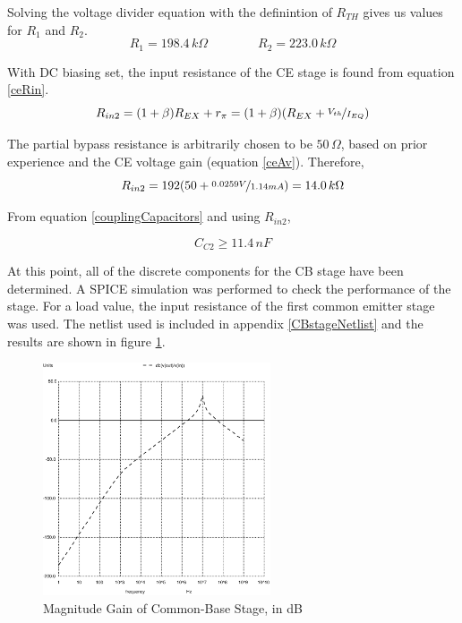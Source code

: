 \documentclass[titlepage, letterpaper, 11pt]{article}
\begin{document}
Solving the voltage divider equation with the definintion of $R_{TH}$
gives us values for $R_{1}$ and $R_{2}$.
\begin{equation*}
R_{1}=198.4\,k\Omega\qquad\qquad R_{2}=223.0\,k\Omega
\end{equation*}

With DC biasing set, the input resistance of the CE stage is found
from equation \ref{ceRin}.
\begin{equation*}
R_{in2}=(1+\beta)R_{EX}+r_{\pi}=
(1+\beta)(R_{EX}+\nicefrac{V_{th}}{I_{EQ}})
\end{equation*}

The partial bypass resistance is arbitrarily chosen to be
$50\,\Omega$, based on prior experience and the CE voltage gain
(equation \ref{ceAv}). Therefore,
\begin{equation*}
R_{in2}=192(50+\nicefrac{0.0259V}{1.14mA})=14.0\,k\Omega
\end{equation*}

From equation \ref{couplingCapacitors} and using $R_{in2}$,

\begin{equation*}
C_{C2}\geq 11.4\,nF
\end{equation*}

At this point, all of the discrete components for the CB stage have
been determined. A SPICE simulation was performed to check the
performance of the stage. For a load value, the input resistance of
the first common emitter stage was used. The netlist used is included
in appendix \ref{CBstageNetlist} and the results are shown in figure
\ref{CBstageMagnitudePlot}.

\begin{figure}[ht]
	\centering
	\includegraphics[width=0.6\textwidth]
		{ngspice/CBstage.eps}
	\caption{
		Magnitude Gain of Common-Base Stage, in dB
	}
	\label{CBstageMagnitudePlot}
\end{figure}
\end{document}
